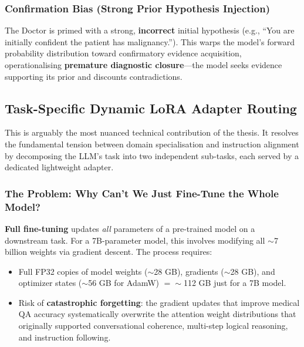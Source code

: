 \subsubsection{Confirmation Bias (Strong Prior Hypothesis Injection)}
\begin{acadbox}[\textcolor{white}{Academic Definition}]
The Doctor is primed with a strong, \textbf{incorrect} initial hypothesis (e.g., ``You are initially confident the patient has malignancy.''). This warps the model's forward probability distribution toward confirmatory evidence acquisition, operationalising \textbf{premature diagnostic closure}---the model seeks evidence supporting its prior and discounts contradictions.
\end{acadbox}

\subsection{Task-Specific Dynamic LoRA Adapter Routing}

This is arguably the most nuanced technical contribution of the thesis. It resolves the fundamental tension between domain specialisation and instruction alignment by decomposing the LLM's task into two independent sub-tasks, each served by a dedicated lightweight adapter.

\subsubsection{The Problem: Why Can't We Just Fine-Tune the Whole Model?}

\begin{acadbox}[\textcolor{white}{Academic Definition}]
\textbf{Full fine-tuning} updates \textit{all} parameters of a pre-trained model on a downstream task. For a 7B-parameter model, this involves modifying all $\sim$7 billion weights via gradient descent. The process requires:
\begin{itemize}
    \item Full FP32 copies of model weights ($\sim$28 GB), gradients ($\sim$28 GB), and optimizer states ($\sim$56 GB for AdamW) $= \sim$112 GB just for a 7B model.
    \item Risk of \textbf{catastrophic forgetting}: the gradient updates that improve medical QA accuracy systematically overwrite the attention weight distributions that originally supported conversational coherence, multi-step logical reasoning, and instruction following.
\end{itemize}
\end{acadbox}

